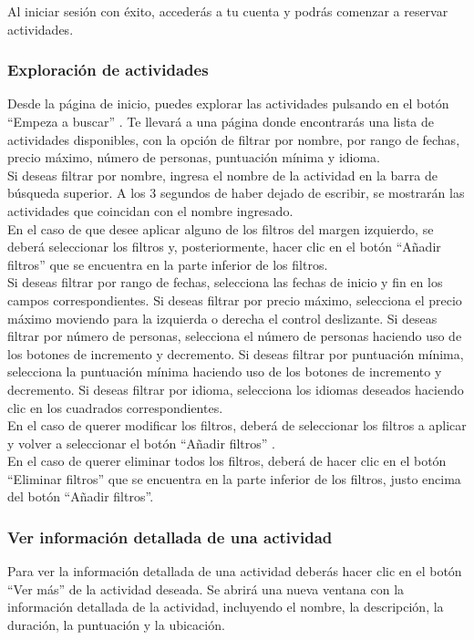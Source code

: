 Al iniciar sesión con éxito, accederás a tu cuenta y podrás comenzar a reservar actividades.

\subsubsection{Exploración de actividades}
Desde la página de inicio, puedes explorar las actividades pulsando en el botón “Empeza a buscar” . Te llevará a una página donde encontrarás una lista de actividades disponibles, con la opción de filtrar por nombre, por rango de fechas, precio máximo, número de personas, puntuación mínima y idioma.
\\[1ex]
Si deseas filtrar por nombre, ingresa el nombre de la actividad en la barra de búsqueda superior. A los 3 segundos de haber dejado de escribir, se mostrarán las actividades que coincidan con el nombre ingresado.
\\[1ex]
En el caso de que desee aplicar alguno de los filtros del margen izquierdo, se deberá seleccionar los filtros y, posteriormente, hacer clic en el botón “Añadir filtros” que se encuentra en la parte inferior de los filtros.
\\[1ex]
Si deseas filtrar por rango de fechas, selecciona las fechas de inicio y fin en los campos correspondientes.
Si deseas filtrar por precio máximo, selecciona el precio máximo moviendo para la izquierda o derecha el control deslizante.
Si deseas filtrar por número de personas, selecciona el número de personas haciendo uso de los botones de incremento y decremento.
Si deseas filtrar por puntuación mínima, selecciona la puntuación mínima haciendo uso de los botones de incremento y decremento.
Si deseas filtrar por idioma, selecciona los idiomas deseados haciendo clic en los cuadrados correspondientes.
\\[1ex]
En el caso de querer modificar los filtros, deberá de seleccionar los filtros a aplicar y volver a seleccionar el botón “Añadir filtros” .
\\[1ex]
En el caso de querer eliminar todos los filtros, deberá de hacer clic en el botón “Eliminar filtros” que se encuentra en la parte inferior de los filtros, justo encima del botón “Añadir filtros”.


\subsubsection{Ver información detallada de una actividad}
Para ver la información detallada de una actividad deberás hacer clic en el botón “Ver más” de la actividad deseada.
Se abrirá una nueva ventana con la información detallada de la actividad, incluyendo el nombre, la descripción, la duración, la puntuación y la ubicación.

